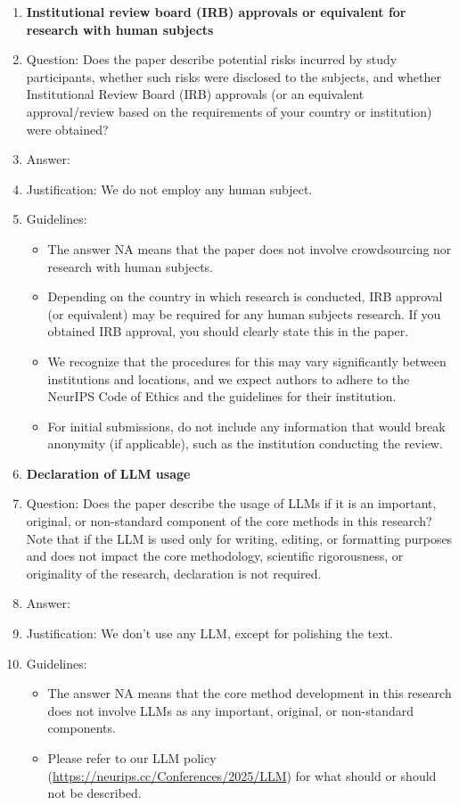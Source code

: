 \documentclass{article}
\begin{document}
\begin{enumerate}
\item {\bf Institutional review board (IRB) approvals or equivalent for research with human subjects}
    \item[] Question: Does the paper describe potential risks incurred by study participants, whether such risks were disclosed to the subjects, and whether Institutional Review Board (IRB) approvals (or an equivalent approval/review based on the requirements of your country or institution) were obtained?
    \item[] Answer: \answerNA{} %
    \item[] Justification: We do not employ any human subject.
    \item[] Guidelines:
    \begin{itemize}
        \item The answer NA means that the paper does not involve crowdsourcing nor research with human subjects.
        \item Depending on the country in which research is conducted, IRB approval (or equivalent) may be required for any human subjects research. If you obtained IRB approval, you should clearly state this in the paper. 
        \item We recognize that the procedures for this may vary significantly between institutions and locations, and we expect authors to adhere to the NeurIPS Code of Ethics and the guidelines for their institution. 
        \item For initial submissions, do not include any information that would break anonymity (if applicable), such as the institution conducting the review.
    \end{itemize}

\item {\bf Declaration of LLM usage}
    \item[] Question: Does the paper describe the usage of LLMs if it is an important, original, or non-standard component of the core methods in this research? Note that if the LLM is used only for writing, editing, or formatting purposes and does not impact the core methodology, scientific rigorousness, or originality of the research, declaration is not required.
    \item[] Answer: \answerNA{} %
    \item[] Justification: We don't use any LLM, except for polishing the text.
    \item[] Guidelines:
    \begin{itemize}
        \item The answer NA means that the core method development in this research does not involve LLMs as any important, original, or non-standard components.
        \item Please refer to our LLM policy (\url{https://neurips.cc/Conferences/2025/LLM}) for what should or should not be described.
    \end{itemize}

\end{enumerate}
\end{document}
